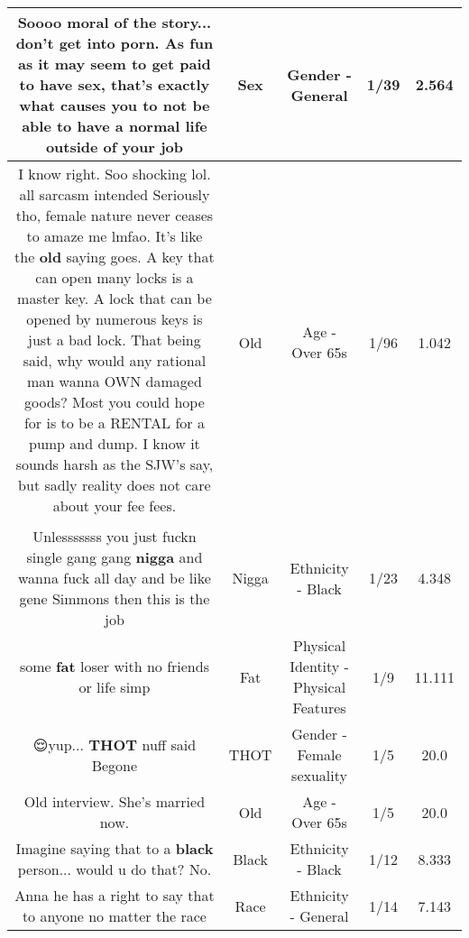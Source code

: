 \documentclass[11pt]{article}
\newlength\mylength
\begin{document}
\begin{center}
\begin{longtable}{|C{.65\mylength}|C{.30\mylength}|C{.12\mylength}|C{.12\mylength}|C{.12\mylength}|}
  \small Soooo moral of the story... don't get into porn. As fun as it may seem to get paid to have \textbf{sex}, that's exactly what causes you to not be able to have a normal life outside of your job\normalsize   & Sex & Gender - General & 1/39 & 2.564 \\  \hline
  \small I know right. Soo shocking lol. all sarcasm intended Seriously tho, female nature never ceases to amaze me lmfao. It's like the \textbf{old} saying goes. A key that can open many locks is a master key. A lock that can be opened by numerous keys is just a bad lock. That being said, why would any rational man wanna OWN damaged goods? Most you could hope for is to be a RENTAL for a pump and dump. I know it sounds harsh as the SJW's say, but sadly reality does not care about your fee fees.\normalsize   & Old & Age - Over 65s & 1/96 & 1.042 \\  \hline
  \small Unlesssssss you just fuckn single gang gang \textbf{nigga} and wanna fuck all day and be like gene Simmons then this is the job\normalsize   & Nigga & Ethnicity - Black & 1/23 & 4.348 \\  \hline
  \small some \textbf{fat} loser with no friends or life simp\normalsize   & Fat & Physical Identity - Physical Features & 1/9 & 11.111 \\  \hline
  \small 😌yup... \textbf{THOT} nuff said Begone\normalsize   & THOT & Gender - Female sexuality & 1/5 & 20.0 \\  \hline
  \small Old interview. She's married now.\normalsize   & Old & Age - Over 65s & 1/5 & 20.0 \\  \hline
  \small Imagine saying that to a \textbf{black} person... would u do that? No.\normalsize   & Black & Ethnicity - Black & 1/12 & 8.333 \\  \hline
  \small Anna he has a right to say that to anyone no matter the race\normalsize   & Race & Ethnicity - General & 1/14 & 7.143 \\  \hline

\end{longtable}
\end{center}
\end{document}
